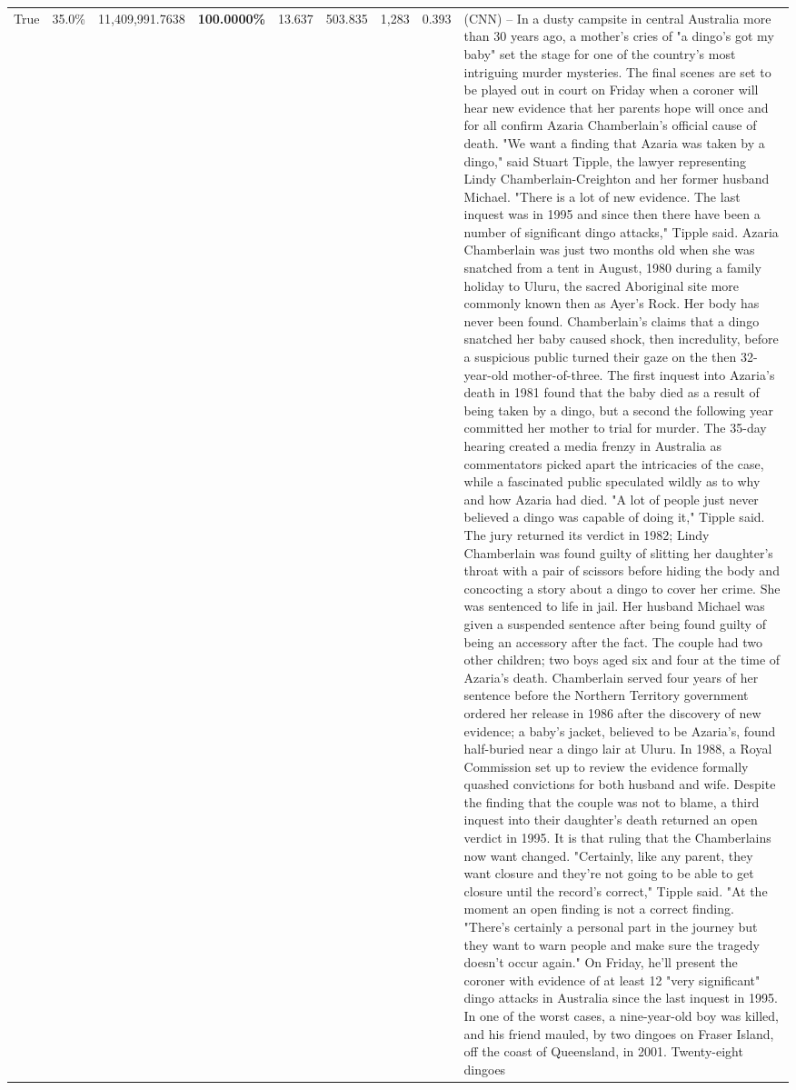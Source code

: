 \begin{table}[H]
\begin{tabular}{lllrlllll}
True & 35.0\% & 11,409,991.7638 & \bfseries \color{red} 100.0000\% & 13.637 & 503.835 & 1,283 & 0.393 & (CNN) -- In a dusty campsite in central Australia more than 30 years ago, a mother's cries of "a dingo's got my baby" set the stage for one of the country's most intriguing murder mysteries. The final scenes are set to be played out in court on Friday when a coroner will hear new evidence that her parents hope will once and for all confirm Azaria Chamberlain's official cause of death. "We want a finding that Azaria was taken by a dingo," said Stuart Tipple, the lawyer representing Lindy Chamberlain-Creighton and her former husband Michael. "There is a lot of new evidence. The last inquest was in 1995 and since then there have been a number of significant dingo attacks," Tipple said. Azaria Chamberlain was just two months old when she was snatched from a tent in August, 1980 during a family holiday to Uluru, the sacred Aboriginal site more commonly known then as Ayer's Rock. Her body has never been found. Chamberlain's claims that a dingo snatched her baby caused shock, then incredulity, before a suspicious public turned their gaze on the then 32-year-old mother-of-three. The first inquest into Azaria's death in 1981 found that the baby died as a result of being taken by a dingo, but a second the following year committed her mother to trial for murder. The 35-day hearing created a media frenzy in Australia as commentators picked apart the intricacies of the case, while a fascinated public speculated wildly as to why and how Azaria had died. "A lot of people just never believed a dingo was capable of doing it," Tipple said. The jury returned its verdict in 1982; Lindy Chamberlain was found guilty of slitting her daughter's throat with a pair of scissors before hiding the body and concocting a story about a dingo to cover her crime. She was sentenced to life in jail. Her husband Michael was given a suspended sentence after being found guilty of being an accessory after the fact. The couple had two other children; two boys aged six and four at the time of Azaria's death. Chamberlain served four years of her sentence before the Northern Territory government ordered her release in 1986 after the discovery of new evidence; a baby's jacket, believed to be Azaria's, found half-buried near a dingo lair at Uluru. In 1988, a Royal Commission set up to review the evidence formally quashed convictions for both husband and wife. Despite the finding that the couple was not to blame, a third inquest into their daughter's death returned an open verdict in 1995. It is that ruling that the Chamberlains now want changed. "Certainly, like any parent, they want closure and they're not going to be able to get closure until the record's correct," Tipple said. "At the moment an open finding is not a correct finding. "There's certainly a personal part in the journey but they want to warn people and make sure the tragedy doesn't occur again." On Friday, he'll present the coroner with evidence of at least 12 "very significant" dingo attacks in Australia since the last inquest in 1995. In one of the worst cases, a nine-year-old boy was killed, and his friend mauled, by two dingoes on Fraser Island, off the coast of Queensland, in 2001. Twenty-eight dingoes 
\end{tabular}
\end{table}
